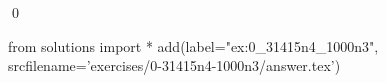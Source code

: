 \begin{ex}
  \label{ex:0_31415n4_1000n3}
  
  \mbox{}\\ \\
  \qed
\end{ex}
\begin{python0}
from solutions import *
add(label="ex:0_31415n4_1000n3",
    srcfilename='exercises/0-31415n4-1000n3/answer.tex') 
\end{python0}                              
